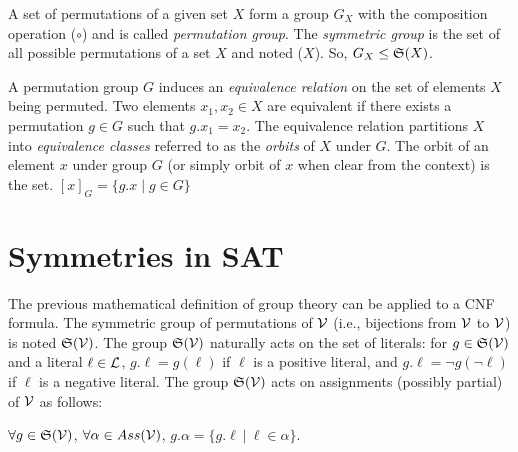 
A set of permutations of a given set $X$ form a group $G_X$ with the composition operation ($\circ$) and is called \emph{permutation group}.
The \emph{symmetric group} is the set of all possible permutations of a set $X$ and noted \Group($X$).
So, $G_X \leq \mathfrak{S}(X)$. 

A permutation group $G$ induces an \emph{equivalence relation} on the set of elements $X$ being
permuted. Two elements $x_1, x_2 \in X$ are equivalent if there exists a permutation $g \in G$ such that
$g.x_1 = x_2$. The equivalence relation partitions $X$ into \emph{equivalence classes} referred to
as the \emph{orbits} of $X$ under $G$. The orbit of an element $x$ under group $G$ (or simply orbit of $x$ when clear
from the context) is the set. $[x]_G = \{g.x \mid g \in G\}$

\section{Symmetries in SAT}
The previous mathematical definition of group theory can be applied to a CNF formula.
The symmetric group of permutations of $\mathcal{V}$ (i.e., bijections from $\mathcal{V}$ to $\mathcal{V}$) is noted
$\mathfrak{S}(\mathcal{V})$. The group $\mathfrak{S}(\mathcal{V})$ naturally acts on the set of literals: for $g
\in \mathfrak{S}(\mathcal{V})$ and a literal $\ell \in \mathcal{L} $, $g.\ell = g(\ell)$ if $\ell$ is a
positive literal, and $g.\ell = \neg g(\neg \ell)$ if $\ell$ is a negative literal.
The group $\mathfrak{S}(\mathcal{V})$ acts on  assignments (possibly partial) of $\mathcal{V}$ as follows: 
\begin{center}
 $\forall g \in \mathfrak{S}(\mathcal{V})$, $ \forall \alpha \in Ass(\mathcal{V})$, $g.\alpha = \{ g.\ell ~|~ \ell \in \alpha \}$.
\end{center}


